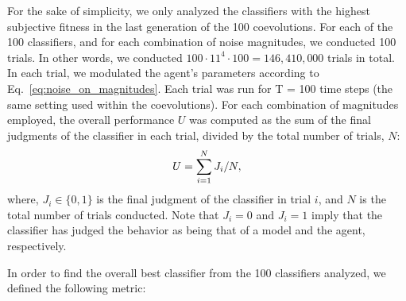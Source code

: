 For the sake of simplicity, we only analyzed the classifiers with the highest subjective fitness in the last generation of the 100 coevolutions. For each of the 100 classifiers, and for each combination of noise magnitudes, we conducted 100 trials. In other words, we conducted $100 \cdot 11^4 \cdot 100 = 146,410,000$ trials in total. 
In each trial, we modulated the agent's parameters according to Eq.~\ref{eq:noise_on_magnitudes}.
Each trial was run for T = 100 time steps (the same setting used within the coevolutions). 
For each combination of magnitudes employed, the overall performance $U$ was computed as the sum of the final judgments of the classifier in each trial, divided by the total number of trials, $N$: 
\begin{equation}{\label{eq:performance_metric_model}}
U = \sum\limits_{i = 1}^{N} {{J_i}}/N,
\end{equation}
where, $J_i\in\{0,1\}$ is the final judgment of the classifier in trial $i$, and $N$ is the total number of trials conducted. Note that $J_i = 0$ and $J_i = 1$ imply that the classifier has judged the behavior as being that of a model and the agent, respectively.

In order to find the overall best classifier from the 100 classifiers analyzed, we defined the following metric:  


